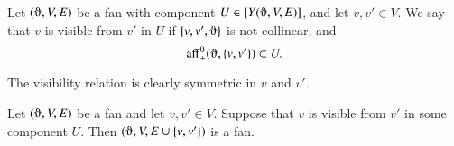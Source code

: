 


\begin{definition}
Let $(\orgn,V,E)$ be a fan with component $U\in \comp{Y(\orgn,V,E)}$, 
and let $v,v'\in V$.  We say
that $v$ is visible from $v'$ in $U$ 
if $\{v,v',\orgn\}$ is not
collinear,  and
  $$\op{aff}_+^0(\orgn,\{v,v'\})\subset U.$$
\end{definition}

The visibility relation is clearly symmetric in $v$ and $v'$.

\begin{lemma} Let $(\orgn,V,E)$ be a fan and let $v,v'\in V$.
Suppose that $v$ is visible from $v'$ in some component $U$.  
Then
$(\orgn,V,E\cup\{v,v'\})$ is a fan.
\end{lemma}

